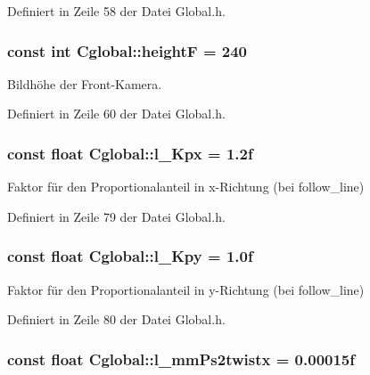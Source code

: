 Definiert in Zeile 58 der Datei Global.h.

\hypertarget{class_cglobal_a601f81a0ed28e4e0ca387134ba76738e}{
\subsubsection[{heightF}]{\setlength{\rightskip}{0pt plus 5cm}const int {\bf Cglobal::heightF} = 240}}
\label{class_cglobal_a601f81a0ed28e4e0ca387134ba76738e}


Bildhöhe der Front-\/Kamera. 



Definiert in Zeile 60 der Datei Global.h.

\hypertarget{class_cglobal_a6c5a5a9fb3c2da5264622c738b326245}{
\subsubsection[{l\_\-Kpx}]{\setlength{\rightskip}{0pt plus 5cm}const float {\bf Cglobal::l\_\-Kpx} = 1.2f}}
\label{class_cglobal_a6c5a5a9fb3c2da5264622c738b326245}


Faktor für den Proportionalanteil in x-\/Richtung (bei follow\_\-line) 



Definiert in Zeile 79 der Datei Global.h.

\hypertarget{class_cglobal_a458383235afe73b333a22a5edcc3eed6}{
\subsubsection[{l\_\-Kpy}]{\setlength{\rightskip}{0pt plus 5cm}const float {\bf Cglobal::l\_\-Kpy} = 1.0f}}
\label{class_cglobal_a458383235afe73b333a22a5edcc3eed6}


Faktor für den Proportionalanteil in y-\/Richtung (bei follow\_\-line) 



Definiert in Zeile 80 der Datei Global.h.

\hypertarget{class_cglobal_a7440e55e4a63e1c926c582a36a4d6bd7}{
\subsubsection[{l\_\-mmPs2twistx}]{\setlength{\rightskip}{0pt plus 5cm}const float {\bf Cglobal::l\_\-mmPs2twistx} = 0.00015f}}
\label{class_cglobal_a7440e55e4a63e1c926c582a36a4d6bd7}


